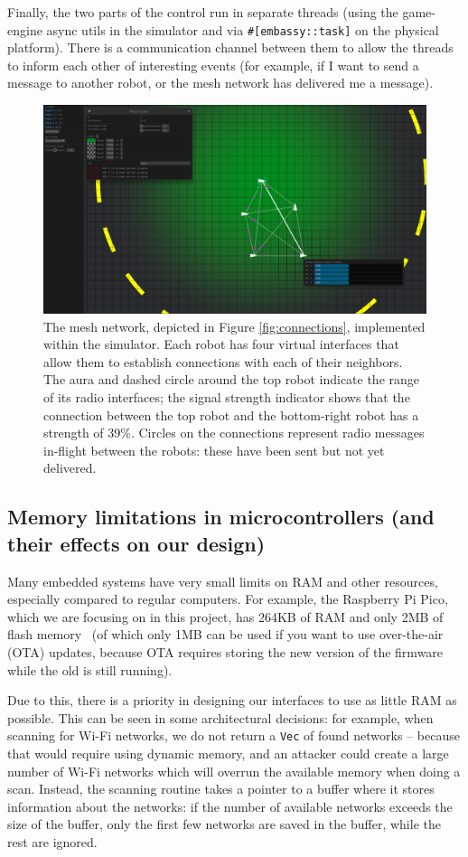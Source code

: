 \documentclass[%
]{article}
\begin{document}
Finally, the two parts of the control run in separate threads
(using the game-engine async utils in the simulator and via \texttt{\#[embassy::task]} on the physical platform).
There is a communication channel between them to allow the threads to inform each other of interesting events
(for example, if I want to send a message to another robot,
or the mesh network has delivered me a message).

\begin{figure}
  \centering
  \includegraphics[width=0.8\linewidth]{simulator-connections}
  \caption{The mesh network, depicted in Figure \ref{fig:connections}, implemented within the simulator. Each robot has four virtual interfaces that allow them to establish connections with each of their neighbors. The aura and dashed circle around the top robot indicate the range of its radio interfaces; the signal strength indicator shows that the connection between the top robot and the bottom-right robot has a strength of 39\%. Circles on the connections represent radio messages in-flight between the robots: these have been sent but not yet delivered.}
  \label{fig:simulator-connections}
\end{figure}


\subsection{Memory limitations in microcontrollers (and their effects on our design)}

Many embedded systems have very small limits on RAM and other resources,
especially compared to regular computers. For example, the Raspberry Pi Pico,
which we are focusing on in this project,
has 264KB of RAM and only 2MB of flash memory~\cite{raspberrypi2021}
(of which only 1MB can be used if you want to use over-the-air (OTA) updates,
because OTA requires storing the new version of the firmware while the old is still running).

Due to this, there is a priority in designing our interfaces to use as little RAM as possible.
This can be seen in some architectural decisions:
for example, when scanning for Wi-Fi networks,
we do not return a \texttt{Vec} of found networks --
because that would require using dynamic memory,
and an attacker could create a large number of Wi-Fi networks which will overrun the available memory when doing a scan.
Instead, the scanning routine takes a pointer to a buffer where it stores information about the networks:
if the number of available networks exceeds the size of the buffer,
only the first few networks are saved in the buffer, while the rest are ignored.
\end{document}
